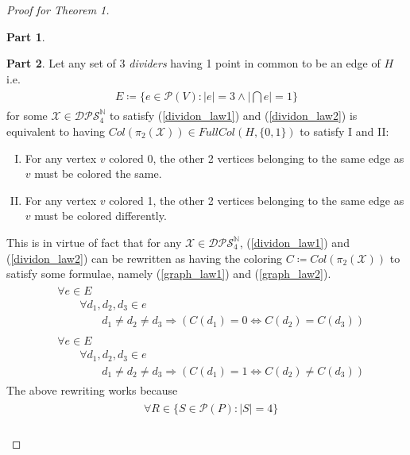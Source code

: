 \documentclass[11pt, oneside]{article}      %
\theoremstyle{definition}
\newtheorem{proofpart}{Part}[theo]
\numberwithin{equation}{section}
\newcommand{\reff}[1]{(\ref{#1})}
\theoremstyle{c}
\begin{document}
\begin{proof}[Proof for \textit{Theorem 1}]
\begin{proofpart}
\end{proofpart}
\begin{proofpart}
Let any set of 3 \textit{dividers} having 1 point in common to be an edge of $H$ i.e.
\begin{gather}\begin{split}\label{edges}
E \coloneqq \{ e \in \mathcal{P}(V) :  |e| = 3 \land |\bigcap e| = 1 \}
\end{split}\end{gather}
for some $\mathscr{X} \in \mathscr{DPS}^\mathbb{N}_4$ to satisfy \reff{dividon_law1} and \reff{dividon_law2} is equivalent to having $Col(\pi_2(\mathscr{X})) \in FullCol(H,\{0,1\})$ to satisfy I and II:
\begin{enumerate}[I.]
\item For any vertex $v$ colored 0, the other 2 vertices belonging to the same edge as $v$ must be colored the same.
\item For any vertex $v$ colored 1, the other 2 vertices belonging to the same edge as $v$ must be colored differently.
\end{enumerate}
This is in virtue of fact that for any $\mathscr{X} \in \mathscr{DPS}^\mathbb{N}_4$, \reff{dividon_law1} and  \reff{dividon_law2} can be rewritten as having the coloring $C \coloneqq Col(\pi_2(\mathscr{X}))$ to satisfy some formulae, namely \reff{graph_law1} and \reff{graph_law2}.
\begin{align}
\begin{split} \label{graph_law1}
&\forall e \in E \\
&\qquad  \forall d_1, d_2, d_3 \in e \\
&\qquad \qquad  d_1 \not = d_2 \not = d_3 \Rightarrow (C(d_1) = 0 \Leftrightarrow C(d_2) = C(d_3))
\end{split}
\end{align}
\begin{align}
\begin{split}  \label{graph_law2}
&\forall e \in E \\
&\qquad  \forall d_1, d_2, d_3 \in e \\
&\qquad \qquad  d_1 \not = d_2 \not = d_3 \Rightarrow (C(d_1) = 1 \Leftrightarrow C(d_2) \not= C(d_3))
\end{split}
\end{align}
 The above rewriting works because
\begin{align}\begin{split}\label{phi_to_psi}
&\forall R \in \{ S \in \mathcal{P}(P) : |S| =4 \} \\

\end{split}
\end{align}
\end{proofpart}
\end{proof}
\end{document}
